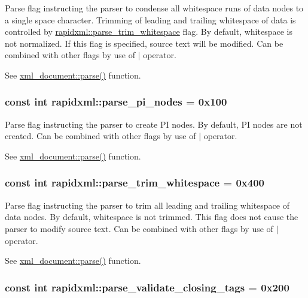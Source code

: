 \label{d7/d8a/namespacerapidxml_a31f33885defb5176a7d99e524c35d386}
Parse flag instructing the parser to condense all whitespace runs of data nodes to a single space character. Trimming of leading and trailing whitespace of data is controlled by \hyperlink{namespacerapidxml_a61912424b47db5038e726d4e1c22417f}{rapidxml::parse\_\-trim\_\-whitespace} flag. By default, whitespace is not normalized. If this flag is specified, source text will be modified. Can be combined with other flags by use of $|$ operator. \par
\par
 See \hyperlink{classrapidxml_1_1xml__document_ad510b0c5fd8bf0180a55ffb2476e59e4}{xml\_\-document::parse()} function. \hypertarget{namespacerapidxml_a03fe68fcf5d28f38476e0fd31adecc4c}{
\subsubsection[{parse\_\-pi\_\-nodes}]{\setlength{\rightskip}{0pt plus 5cm}const int {\bf rapidxml::parse\_\-pi\_\-nodes} = 0x100}}
\label{d7/d8a/namespacerapidxml_a03fe68fcf5d28f38476e0fd31adecc4c}
Parse flag instructing the parser to create PI nodes. By default, PI nodes are not created. Can be combined with other flags by use of $|$ operator. \par
\par
 See \hyperlink{classrapidxml_1_1xml__document_ad510b0c5fd8bf0180a55ffb2476e59e4}{xml\_\-document::parse()} function. \hypertarget{namespacerapidxml_a61912424b47db5038e726d4e1c22417f}{
\subsubsection[{parse\_\-trim\_\-whitespace}]{\setlength{\rightskip}{0pt plus 5cm}const int {\bf rapidxml::parse\_\-trim\_\-whitespace} = 0x400}}
\label{d7/d8a/namespacerapidxml_a61912424b47db5038e726d4e1c22417f}
Parse flag instructing the parser to trim all leading and trailing whitespace of data nodes. By default, whitespace is not trimmed. This flag does not cause the parser to modify source text. Can be combined with other flags by use of $|$ operator. \par
\par
 See \hyperlink{classrapidxml_1_1xml__document_ad510b0c5fd8bf0180a55ffb2476e59e4}{xml\_\-document::parse()} function. \hypertarget{namespacerapidxml_a7ce8f40fda68338e20b56f41e48e49f3}{
\subsubsection[{parse\_\-validate\_\-closing\_\-tags}]{\setlength{\rightskip}{0pt plus 5cm}const int {\bf rapidxml::parse\_\-validate\_\-closing\_\-tags} = 0x200}}
